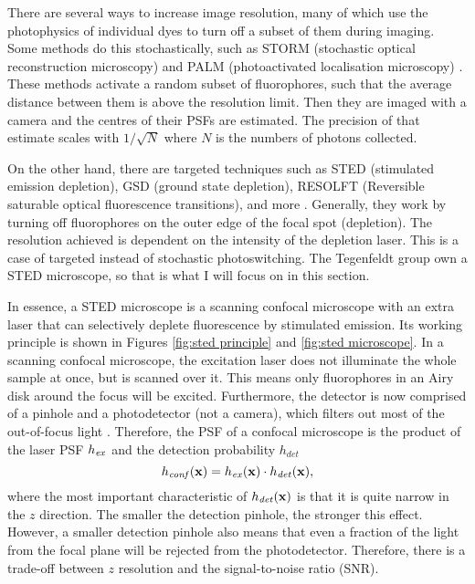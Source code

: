 There are several ways to increase image resolution, many of which use the photophysics of individual dyes to turn off a subset of them during imaging. Some methods do this stochastically, such as STORM (stochastic optical reconstruction microscopy) and PALM (photoactivated localisation microscopy) \cite{Mock2009, Betzig2006}. These methods activate a random subset of fluorophores, such that the average distance between them is above the resolution limit. Then they are imaged with a camera and the centres of their PSFs are estimated. The precision of that estimate scales with $ 1/\sqrt{N} $ where $ N $ is the numbers of photons collected.

On the other hand, there are targeted techniques such as STED (stimulated emission depletion), GSD (ground state depletion), RESOLFT (Reversible saturable optical fluorescence transitions), and more \cite{Klar2000, Folling2008, Hofmann2005}. Generally, they work by turning off fluorophores on the outer edge of the focal spot (depletion). The resolution achieved is dependent on the intensity of the depletion laser. This is a case of targeted instead of stochastic photoswitching. The Tegenfeldt group own a STED microscope, so that is what I will focus on in this section. 

In essence, a STED microscope is a scanning confocal microscope with an extra laser that can selectively deplete fluorescence by stimulated emission. Its working principle is shown in Figures \ref{fig:sted principle} and \ref{fig:sted microscope}. In a scanning confocal microscope, the excitation laser does not illuminate the whole sample at once, but is scanned over it. This means only fluorophores in an Airy disk around the focus will be excited. Furthermore, the detector is now comprised of a pinhole and a photodetector (not a camera), which filters out most of the out-of-focus light \cite{Minsky1957}. Therefore, the PSF of a confocal microscope is the product of the laser PSF $ h_{\mathit{ex}} $ and the detection probability $ h_\mathit{det} $
\begin{equation}
	h_\mathit{conf}(\vb{x}) = h_{\mathit{ex}}(\vb{x}) \cdot h_\mathit{det}(\vb{x}),
\end{equation}
where the most important characteristic of $ h_\mathit{det}(\vb{x}) $ is that it is quite narrow in the $ z $ direction. The smaller the detection pinhole, the stronger this effect. However, a smaller detection pinhole also means that even a fraction of the light from the focal plane will be rejected from the photodetector. Therefore, there is a trade-off between $ z $ resolution and the signal-to-noise ratio (SNR).

